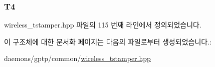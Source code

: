 \subsubsection[{\texorpdfstring{T4}{T4}}]{ T4}\hypertarget{struct___t_i_m_i_n_g_m_s_m_t___c_o_n_f_i_r_m___e_v_e_n_t___d_a_t_a_a8cea6315d4cb7873c4a4440330e6453f}{}\label{struct___t_i_m_i_n_g_m_s_m_t___c_o_n_f_i_r_m___e_v_e_n_t___d_a_t_a_a8cea6315d4cb7873c4a4440330e6453f}


wireless\+\_\+tstamper.\+hpp 파일의 115 번째 라인에서 정의되었습니다.



이 구조체에 대한 문서화 페이지는 다음의 파일로부터 생성되었습니다.\+:\begin{DoxyCompactItemize}
\item 
daemons/gptp/common/\hyperlink{wireless__tstamper_8hpp}{wireless\+\_\+tstamper.\+hpp}\end{DoxyCompactItemize}
